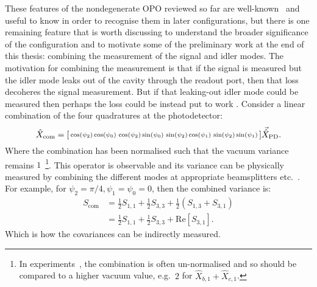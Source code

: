 These features of the nondegenerate OPO reviewed so far are well-known~\cite{} and useful to know in order to recognise them in later configurations, but there is one remaining feature that is worth discussing to understand the broader significance of the configuration and to motivate some of the preliminary work  at the end of this thesis: combining the measurement of the signal and idler modes. The motivation for combining the measurement is that if the signal is measured but the idler mode leaks out of the cavity through the readout port, then that loss decoheres the signal measurement. But if that leaking-out idler mode could be measured then perhaps the loss could be instead put to work . Consider a linear combination of the four quadratures at the photodetector: $$\hat X_\text{com}=\begin{bsmallmatrix}\cos(\psi_2)\cos(\psi_0) & \cos(\psi_2)\sin(\psi_0) & \sin(\psi_2)\cos(\psi_1) & \sin(\psi_2)\sin(\psi_1)\end{bsmallmatrix}\vec{\hat X}_\text{PD}.$$ 
Where the combination has been normalised such that the vacuum variance remains $1$~\footnote{In experiments~\cite{Schori2001}, the combination is often un-normalised and so should be compared to a higher vacuum value, e.g.\ $2$ for $\hat X_{b,1} + \hat X_{c,1}$.}. This operator is observable and its variance can be physically measured by combining the different modes at appropriate beamsplitters etc.~\cite{Schori2001}.  For example, for $\psi_2=\pi/4,\psi_1=\psi_0=0$, then the combined variance is:
\begin{align}S_\text{com}&=\frac{1}{2}S_{1,1}+\frac{1}{2}S_{3,3}+\frac{1}{2}(S_{1,3}+S_{3,1})\\
&=\frac{1}{2}S_{1,1}+\frac{1}{2}S_{3,3}+\text{Re}[S_{3,1}].\end{align}
Which is how the covariances can be indirectly measured.












